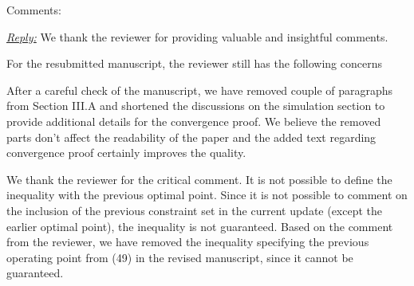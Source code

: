 Comments:

\vspace{1eM}
\underline{\textit{Reply:}} We thank the reviewer for providing valuable and insightful comments.

\vspace{1eM}
For the resubmitted manuscript, the reviewer still has the following concerns

\begin{enumerate}
 

\resp After a careful check of the manuscript, we have removed couple of paragraphs from Section III.A and shortened the discussions on the simulation section to provide additional details for the convergence proof. We believe the removed parts don't affect the readability of the paper and the added text regarding convergence proof certainly improves the quality. 

 

\resp We thank the reviewer for the critical comment. It is not possible to define the inequality with the previous optimal point. Since it is not possible to comment on the inclusion of the previous constraint set in the current update (except the earlier optimal point), the inequality is not guaranteed. Based on the comment from the reviewer, we have removed the inequality specifying the previous operating point from (49) in the revised manuscript, since it cannot be guaranteed. 

 


\end{enumerate}
